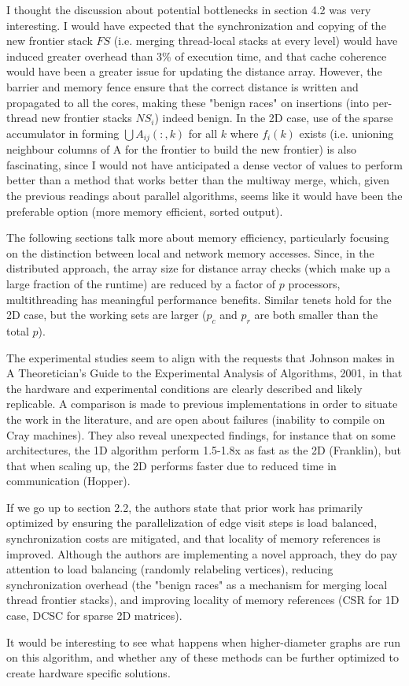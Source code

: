 I thought the discussion about potential bottlenecks in section 4.2 was very interesting. I would have expected that the synchronization and copying of the new frontier stack $FS$ (i.e. merging thread-local stacks at every level) would have induced greater overhead than 3\% of execution time, and that cache coherence would have been a greater issue for updating the distance array. However, the barrier and memory fence ensure that the correct distance is written and propagated to all the cores, making these "benign races" on insertions (into per-thread new frontier stacks $NS_i$) indeed benign. In the 2D case, use of the sparse accumulator in forming $\bigcup A_{ij}(:,k)$ for all $k$ where $f_i(k)$ exists (i.e. unioning neighbour columns of A for the frontier to build the new frontier) is also fascinating, since I would not have anticipated a dense vector of values to perform better than a method that works better than the multiway merge, which, given the previous readings about parallel algorithms, seems like it would have been the preferable option (more memory efficient, sorted output).

The following sections talk more about memory efficiency, particularly focusing on the distinction between local and network memory accesses. Since, in the distributed approach, the array size for distance array checks (which make up a large fraction of the runtime) are reduced by a factor of $p$ processors, multithreading has meaningful performance benefits. Similar tenets hold for the 2D case, but the working sets are larger ($p_c$ and $p_r$ are both smaller than the total $p$). 

The experimental studies seem to align with the requests that Johnson makes in A Theoretician's Guide to the Experimental Analysis of Algorithms, 2001, in that the hardware and experimental conditions are clearly described and likely replicable. A comparison is made to previous implementations in order to situate the work in the literature, and are open about failures (inability to compile on Cray machines). They also reveal unexpected findings, for instance that on some architectures, the 1D algorithm perform 1.5-1.8x as fast as the 2D (Franklin), but that when scaling up, the 2D performs faster due to reduced time in communication (Hopper). 

If we go up to section 2.2, the authors state that prior work has primarily optimized by ensuring the parallelization of edge visit steps is load balanced, synchronization costs are mitigated, and that locality of memory references is improved. Although the authors are implementing a novel approach, they do pay attention to load balancing (randomly relabeling vertices), reducing synchronization overhead (the "benign races" as a mechanism for merging local thread frontier stacks), and improving locality of memory references (CSR for 1D case, DCSC for sparse 2D matrices).

It would be interesting to see what happens when higher-diameter graphs are run on this algorithm, and whether any of these methods can be further optimized to create hardware specific solutions.